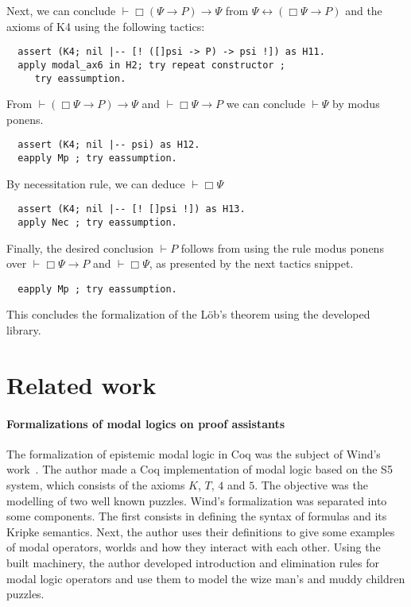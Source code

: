 \documentclass[sigconf,anonymous]{acmart}
\begin{document}
\noindent Next, we can conclude $\vdash \Box (\Psi \to P) \to \Psi$ from
$\Psi \leftrightarrow (\Box \Psi \to P)$ and the axioms of K4 using
the following tactics:

\begin{verbatim}
  assert (K4; nil |-- [! ([]psi -> P) -> psi !]) as H11.
  apply modal_ax6 in H2; try repeat constructor ;
     try eassumption.
\end{verbatim}

\noindent From $\vdash (\Box\Psi \to P) \to \Psi$ and $\vdash \Box \Psi \to P$
we can conclude $\vdash \Psi$ by modus ponens.

\begin{verbatim}
  assert (K4; nil |-- psi) as H12.
  eapply Mp ; try eassumption.
\end{verbatim}

\noindent By necessitation rule, we can deduce $\vdash \Box \Psi$

\begin{verbatim}
  assert (K4; nil |-- [! []psi !]) as H13.
  apply Nec ; try eassumption.
\end{verbatim}

\noindent Finally, the desired conclusion $\vdash P$ follows from
using the rule modus ponens over $\vdash \Box \Psi \to P$
and $\vdash \Box \Psi$, as presented by the next tactics
snippet.

\begin{verbatim}
  eapply Mp ; try eassumption.
\end{verbatim}

\noindent This concludes the formalization of the L\"ob's theorem using
the developed library.

\section{Related work}\label{sec:related}

\paragraph{Formalizations of modal logics on proof assistants}

The formalization of epistemic modal logic in Coq was the subject of Wind's
work~\cite{dewind}.
The author made a Coq implementation of modal logic based on the S5 system,
which consists of  the axioms $K$, $T$, $4$ and $5$. The objective was the
modelling of two well known puzzles.
Wind's formalization was separated into some components. The first consists in
defining the syntax of formulas and its Kripke semantics. Next, the author uses
their definitions to give some examples of modal operators, worlds and how they
interact with each other. Using the built machinery, the author developed
introduction and elimination rules for modal logic operators and use them to
model the wize man's and muddy children puzzles.
\end{document}
